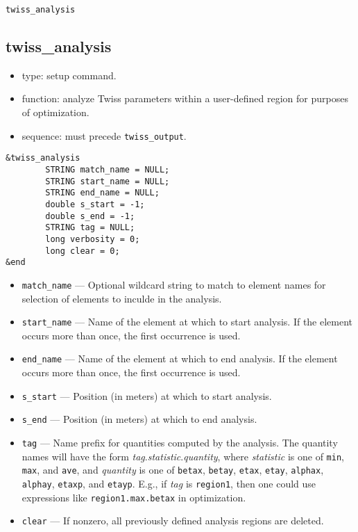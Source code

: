 \documentclass[11pt]{article}
\begin{document}
\newpage
\begin{center}{\Large\verb|twiss_analysis|}\end{center}
\subsection{twiss\_analysis \label{subsec:twissanalysis}}

\begin{itemize}
\item type: setup command.
\item function: analyze Twiss parameters within a user-defined region for purposes of
        optimization.
\item sequence: must precede \verb|twiss_output|.
\end{itemize}

\begin{verbatim}
&twiss_analysis
        STRING match_name = NULL;
        STRING start_name = NULL;
        STRING end_name = NULL;
        double s_start = -1;
        double s_end = -1;
        STRING tag = NULL;
        long verbosity = 0;
        long clear = 0;
&end
\end{verbatim}

\begin{itemize}
\item \verb|match_name| --- Optional wildcard string to match to element names for selection
  of elements to inculde in the analysis.
\item \verb|start_name| --- Name of the element at which to start analysis.  If the
        element occurs more than once, the first occurrence is used.
\item \verb|end_name| --- Name of the element at which to end analysis.  If the
        element occurs more than once, the first occurrence is used.
\item \verb|s_start| --- Position (in meters) at which to start analysis.
\item \verb|s_end| --- Position (in meters) at which to end analysis.
\item \verb|tag| --- Name prefix for quantities computed by the analysis.  The quantity
        names will have the form {\em tag}.{\em statistic}.{\em quantity}, where {\em statistic}
        is one of \verb|min|, \verb|max|, and \verb|ave|, and {\em quantity} is one of
        \verb|betax|, \verb|betay|, \verb|etax|, \verb|etay|, \verb|alphax|, \verb|alphay|, 
        \verb|etaxp|, and \verb|etayp|. E.g., if {\em tag} is \verb|region1|,
        then one could use expressions like \verb|region1.max.betax| in optimization.
\item \verb|clear| --- If nonzero, all previously defined analysis regions are deleted.
\end{itemize}
\end{document}
